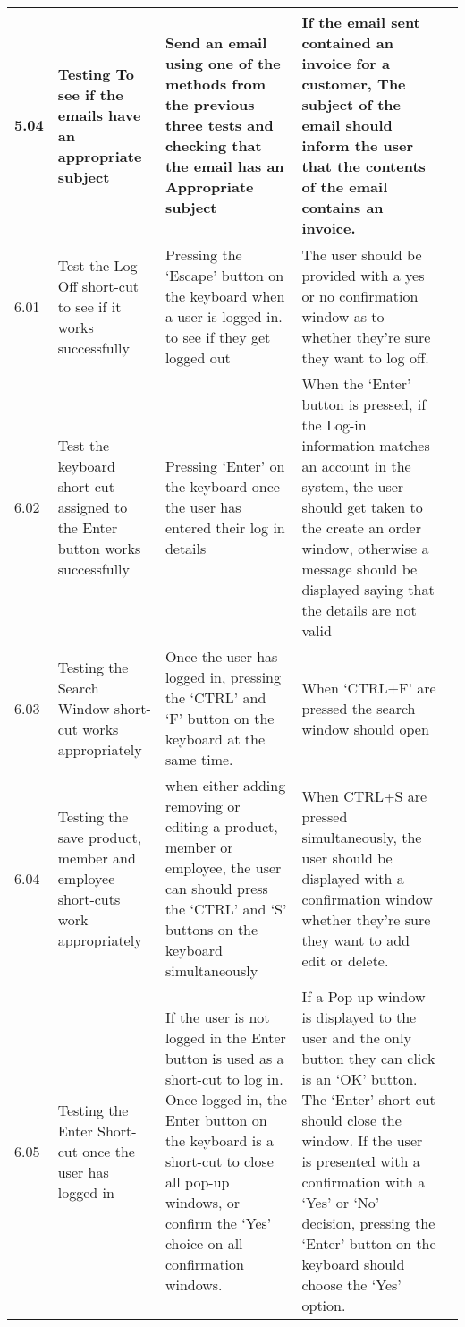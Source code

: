 \begin{flushleft}
\begin{longtable}{|p{1cm}|p{2.5cm}|p{2.5cm}|p{2cm}|p{2cm}|}
	\rowcolor{light-grey} 5.04 & Testing To see if the emails have an appropriate subject & Send an email using one of the methods from the previous three tests and checking that the email has an Appropriate subject & If the email sent contained an invoice for a customer, The subject of the email should inform the user that the contents of the email contains an invoice. &\\ \hline
	\rowcolor{light-grey} 6.01 & Test the Log Off short-cut to see if it works successfully & Pressing the `Escape' button on the keyboard when a user is logged in. to see if they get logged out & The user should be provided with a yes or no confirmation window as to whether they're sure they want to log off.  &\\ \hline
	\rowcolor{light-grey} 6.02 & Test the keyboard short-cut assigned to the Enter button works successfully & Pressing `Enter' on the keyboard once the user has entered their log in details &  When the `Enter' button is pressed, if the Log-in information matches an account in the system, the user should get taken to the create an order window, otherwise a message should be displayed saying that the details are not valid& \\ \hline
	\rowcolor{light-grey} 6.03 & Testing the Search Window short-cut works appropriately &Once the user has logged in, pressing the `CTRL'  and `F' button on the keyboard  at the same time. & When `CTRL+F' are pressed the search window should open& \\ \hline
	\rowcolor{light-grey} 6.04 & Testing the save product, member and employee short-cuts work appropriately & when either adding removing or editing a product, member or employee, the user can should press the `CTRL' and `S' buttons on the keyboard simultaneously & When CTRL+S are pressed simultaneously, the user should be displayed with a confirmation window whether they're sure they want to add edit or delete.& \\ \hline
	\rowcolor{light-grey} 6.05 & Testing the Enter Short-cut once the user has logged in & If the user is not logged in the Enter button is used as a short-cut to log in. Once logged in, the Enter button on the keyboard is a short-cut to close all pop-up windows, or confirm the `Yes' choice on all confirmation windows. & If a Pop up window is displayed to the user and the only button they can click is an `OK' button. The `Enter' short-cut should close the window. If the user is presented with a confirmation with a `Yes' or `No' decision, pressing the `Enter' button on the keyboard should choose the `Yes' option. & \\ \hline

\end{longtable}
\end{flushleft}
